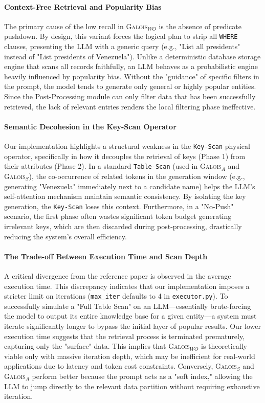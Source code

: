 \paragraph{Context-Free Retrieval and Popularity Bias}
The primary cause of the low recall in \textsc{Galois}$_{WO}$ is the absence of predicate pushdown. By design, this variant forces the logical plan to strip all \texttt{WHERE} clauses, presenting the LLM with a generic query (e.g., "List all presidents" instead of "List presidents of Venezuela"). Unlike a deterministic database storage engine that scans all records faithfully, an LLM behaves as a probabilistic engine heavily influenced by popularity bias. Without the "guidance" of specific filters in the prompt, the model tends to generate only general or highly popular entities. Since the Post-Processing module can only filter data that has been successfully retrieved, the lack of relevant entries renders the local filtering phase ineffective.

\paragraph{Semantic Decohesion in the Key-Scan Operator}
Our implementation highlights a structural weakness in the \texttt{Key-Scan} physical operator, specifically in how it decouples the retrieval of keys (Phase 1) from their attributes (Phase 2). In a standard \texttt{Table-Scan} (used in \textsc{Galois}$_{A}$ and \textsc{Galois}$_{S}$), the co-occurrence of related tokens in the generation window (e.g., generating "Venezuela" immediately next to a candidate name) helps the LLM's self-attention mechanism maintain semantic consistency. By isolating the key generation, the \texttt{Key-Scan} loses this context. Furthermore, in a "No-Push" scenario, the first phase often wastes significant token budget generating irrelevant keys, which are then discarded during post-processing, drastically reducing the system's overall efficiency.

\paragraph{The Trade-off Between Execution Time and Scan Depth}
A critical divergence from the reference paper is observed in the average execution time. This discrepancy indicates that our implementation imposes a stricter limit on iterations (\texttt{max\_iter} defaults to 4 in \texttt{executor.py}). To successfully simulate a "Full Table Scan" on an LLM—essentially brute-forcing the model to output its entire knowledge base for a given entity—a system must iterate significantly longer to bypass the initial layer of popular results. Our lower execution time suggests that the retrieval process is terminated prematurely, capturing only the "surface" data. This implies that \textsc{Galois}$_{WO}$ is theoretically viable only with massive iteration depth, which may be inefficient for real-world applications due to latency and token cost constraints. Conversely, \textsc{Galois}$_{S}$ and \textsc{Galois}$_{A}$ perform better because the prompt acts as a "soft index," allowing the LLM to jump directly to the relevant data partition without requiring exhaustive iteration.